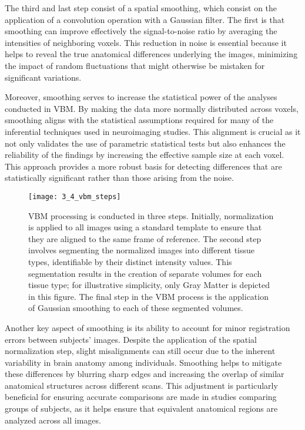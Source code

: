 The third and last step consist of a spatial smoothing, which consist on the
application of a convolution operation with a Gaussian filter. The first is that smoothing can improve effectively the
signal-to-noise ratio by averaging the intensities of neighboring voxels. This
reduction in noise is essential because it helps to reveal the true anatomical
differences underlying the images, minimizing the impact of random fluctuations
that might otherwise be mistaken for significant variations.

Moreover, smoothing serves to increase the statistical power of the analyses
conducted in VBM. By making the data more normally distributed across voxels,
smoothing aligns with the statistical assumptions required for many of the
inferential techniques used in neuroimaging studies. This alignment is crucial
as it not only validates the use of parametric statistical tests but also
enhances the reliability of the findings by increasing the effective sample size
at each voxel. This approach provides a more robust basis for detecting
differences that are statistically significant rather than those arising from
the noise.
\begin{figure*}
    \texttt{[image: 3\_4\_vbm\_steps]}
    \caption[Voxel Based Morphometry Steps]{VBM processing is conducted in three
    steps. Initially, normalization is applied to all images using a standard
    template to ensure that they are aligned to the same frame of reference. The
    second step involves segmenting the normalized images into different tissue
    types, identifiable by their distinct intensity values. This segmentation
    results in the creation of separate volumes for each tissue type; for
    illustrative simplicity, only Gray Matter is depicted in this figure. The
    final step in the VBM process is the application of Gaussian smoothing to
    each of these segmented volumes.}
\end{figure*}
Another key aspect of smoothing is its ability to account for minor registration
errors between subjects' images. Despite the application of the spatial
normalization step, slight misalignments can still occur due to the inherent
variability in brain anatomy among individuals. Smoothing helps to mitigate
these differences by blurring sharp edges and increasing the overlap of similar
anatomical structures across different scans. This adjustment is particularly
beneficial for ensuring accurate comparisons are made in studies comparing
groups of subjects, as it helps ensure that equivalent anatomical regions are
analyzed across all images.

